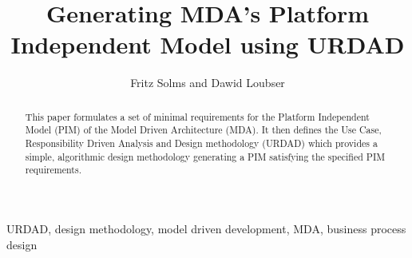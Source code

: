 \documentclass[reviewcopy]{elsart}
\begin{document}
\begin{frontmatter}
\title{Generating MDA's Platform Independent Model using URDAD}

\author{Fritz Solms and Dawid Loubser}
\address{Solms Training and Consulting CC, PostNet Suite 237, Private Bag X9,
Melville, 2109, Johannesburg, South Africa.}


\begin{abstract}
  This paper formulates a set of minimal requirements for the
  Platform Independent Model (PIM) of the Model Driven Architecture
  (MDA). It then defines the Use Case, Responsibility Driven Analysis and
  Design methodology (URDAD) which provides a simple, algorithmic
  design methodology generating a PIM satisfying the specified PIM
  requirements.
\end{abstract}

\begin{keyword}
URDAD, design methodology, model driven development, MDA, business
process design
\end{keyword}
\end{frontmatter}
\end{document}
